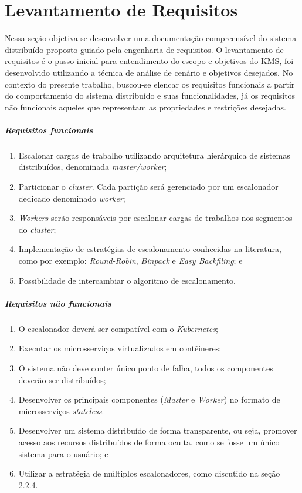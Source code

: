 \section{Levantamento de Requisitos}

Nessa seção objetiva-se desenvolver uma documentação compreensível do sistema distribuído proposto guiado pela engenharia de requisitos. O levantamento de requisitos é o passo inicial para entendimento do escopo e objetivos do \ac{KMS}, foi desenvolvido utilizando a técnica de análise de cenário e objetivos desejados. No contexto do presente trabalho, buscou-se elencar os requisitos funcionais a partir do comportamento do sistema distribuído e suas funcionalidades, já os requisitos não funcionais aqueles que representam as propriedades e restrições desejadas. 

\subparagraph{Requisitos funcionais}
\begin{enumerate}
	\item Escalonar cargas de trabalho utilizando arquitetura hierárquica de sistemas distribuídos, denominada \textit{master/worker};
	\item Particionar o \textit{cluster}. Cada partição será gerenciado por um escalonador dedicado denominado \textit{worker};
	\item \textit{Workers} serão responsáveis por escalonar cargas de trabalhos nos segmentos do \textit{cluster};
	\item Implementação de estratégias de escalonamento conhecidas na literatura, como por exemplo: \textit{Round-Robin}, \textit{Binpack} e \textit{Easy Backfiling}; e
	\item Possibilidade de intercambiar o algoritmo de escalonamento.
\end{enumerate}

\subparagraph{Requisitos não funcionais}
\begin{enumerate}
	\item O escalonador deverá ser compatível com o \textit{Kubernetes};
	\item Executar os microsserviços virtualizados em contêineres;
	\item O sistema não deve conter único ponto de falha, todos os componentes deverão ser distribuídos;
	\item Desenvolver os principais componentes (\textit{Master} e \textit{Worker}) no formato de microsserviços \textit{stateless}.
	\item Desenvolver um sistema distribuído de forma transparente, ou seja, promover acesso aos recursos distribuídos de forma oculta, como se fosse um único sistema para o usuário; e
	\item Utilizar a estratégia de múltiplos escalonadores, como discutido na seção 2.2.4.
\end{enumerate}

